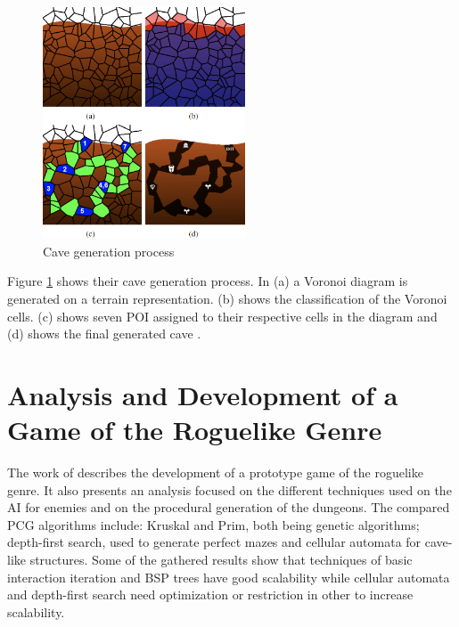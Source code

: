 \begin{figure}[h]
    \caption{Cave generation process}
    \centerline{\includegraphics[width=6cm]{images/related_work/poi_cave.png}}
    \label{fig:poi_cave}
\end{figure}

Figure \ref{fig:poi_cave} shows their cave generation process. In (a) a Voronoi diagram is generated on a terrain representation. (b) shows the classification of the Voronoi cells. (c) shows seven POI assigned to their respective cells in the diagram and (d) shows the final generated cave \citeyear{santamaria:2014}.

\section{Analysis and Development of a
Game of the Roguelike Genre}

The work of \textcite{goncalves:2015} describes the development of a prototype game of the roguelike genre. It also presents an analysis focused on the different techniques used on the AI for enemies and on the procedural generation of the dungeons. The compared PCG algorithms include: Kruskal and Prim, both being genetic algorithms; depth-first search, used to generate perfect mazes and cellular automata for cave-like structures. Some of the gathered results show that techniques of basic interaction iteration and BSP trees have good scalability while cellular automata and depth-first search need optimization or restriction in other to increase scalability.
